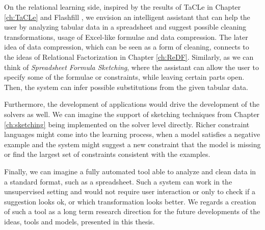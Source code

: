 On the relational learning side, inspired by the results of TaCLe
\parencite{tacle} in Chapter \ref{ch:TaCLe} and Flashfill \parencite{flashfill}, we envision an intelligent
assistant that can help the user by analyzing tabular data in a
spreadsheet and suggest possible cleaning transformations, usage of
Excel-like formulae and data compression. The later idea of data
compression, which can be seen as a form of cleaning, connects to the
ideas of Relational Factorization in Chapter \ref{ch:ReDF}.
Similarly, as we can think of \textit{Spreadsheet Formula Sketching}, where the assistant can allow the user to specify some of the
formulae or constraints, while leaving certain parts open. Then, the
system can infer possible substitutions from the given tabular data.

Furthermore, the development of applications would drive  the
development of the solvers as well. We can imagine the support of
sketching techniques from Chapter \ref{ch:sketching} being implemented
on the solver level directly. Richer constraint languages might come
into the learning process, when a model satisfies a negative example
and the system might suggest a new constraint that the model is
missing or find the largest set of constraints consistent with the
examples.

Finally, we can imagine a fully automated tool able to analyze and
clean data in a standard format, such as a spreadsheet. Such a system
can work in the unsupervised setting and would not require  user interaction
or only to check if a suggestion looks ok, or which transformation looks better.
We regards a creation of such a tool as a long term research direction for
the future developments of the ideas, tools and models, presented in
this thesis.

\cleardoublepage


